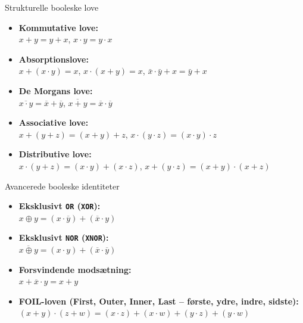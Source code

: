 \begin{custombox}{Strukturelle booleske love}
\begin{itemize}
    \item \textbf{Kommutative love:} \\
    \hspace*{15pt}$x + y = y + x$, \quad $x \cdot y = y \cdot x$
    
    \item \textbf{Absorptionslove:} \\
    \hspace*{15pt}$x + (x \cdot y) = x$, \quad $x \cdot (x + y) = x$, \quad $\bar{x} \cdot \bar{y}+x=\bar{y}+x$
    
    \item \textbf{De Morgans love:} \\
    \hspace*{15pt} $\overline{x \cdot y} = \overline{x} + \overline{y}$, \quad $\overline{x + y} = \overline{x} \cdot \overline{y}$
    \item \textbf{Associative love:} \\
    \hspace*{15pt} $x + (y + z) = (x + y) + z$, \quad $x \cdot (y \cdot z) = (x \cdot y) \cdot z$
    
    \item \textbf{Distributive love:} \\
    \hspace*{15pt} $x \cdot (y + z) = (x \cdot y) + (x \cdot z)$, \quad $x + (y \cdot z) = (x + y) \cdot (x + z)$
\end{itemize}
\end{custombox}

\begin{custombox}{Avancerede booleske identiteter}
\begin{itemize}
    \item \textbf{Eksklusivt \texttt{OR} (\texttt{XOR}):} \\
    \hspace*{15pt} $x \oplus y = (x \cdot \overline{y}) + (\overline{x} \cdot y)$
    
    \item \textbf{Eksklusivt \texttt{NOR} (\texttt{XNOR}):} \\
    \hspace*{15pt} $\overline{x \oplus y} = (x \cdot y) + (\overline{x} \cdot \overline{y})$
    
    \item \textbf{Forsvindende modsætning:} \\
    \hspace*{15pt} $x + \overline{x} \cdot y = x + y$
    
    \item \textbf{FOIL-loven (First, Outer, Inner, Last -- første, ydre, indre, sidste):} \\
    \hspace*{15pt} $(x + y) \cdot (z + w) = (x \cdot z) + (x \cdot w) + (y \cdot z) + (y \cdot w)$
\end{itemize}
\end{custombox}

